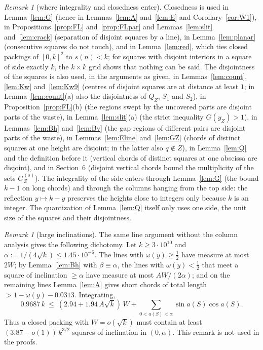 \documentclass[11pt]{amsart}
\theoremstyle{definition}
\theoremstyle{remark}
\newtheorem{remark}[theorem]{Remark}
\begin{document}
\begin{remark}[where integrality and closedness enter]
Closedness is used in Lemma~\ref{lem:G} (hence in Lemmas~\ref{lem:A} and~\ref{lem:E} and Corollary~\ref{cor:W1}), in
Propositions~\ref{prop:FL} and~\ref{prop:FLpar} and Lemmas~\ref{lem:slit} and~\ref{lem:crack} (separation of disjoint squares by a line), in
Lemma~\ref{lem:planar} (consecutive squares do not touch), and in
Lemma~\ref{lem:red}, which ties closed packings of $[0,k]^2$ to $s(n)<k$; for squares with disjoint interiors in a
square of side exactly $k$, the $k\times k$ grid shows that nothing can be said. The disjointness of the squares is also used, in the
arguments as given, in Lemmas~\ref{lem:count}, \ref{lem:Kw} and~\ref{lem:Kw9} (centres of disjoint squares are at distance at least $1$;
in Lemma~\ref{lem:count}(a) also the disjointness of $Q_Z$, $S_1$ and $S_2$), in Proposition~\ref{prop:FL}(b) (the regions swept by
the uncovered parts are disjoint parts of the waste), in Lemma~\ref{lem:slit}(a) (the strict inequality $G(y_Z)>1$), in Lemmas~\ref{lem:Bh}
and~\ref{lem:Bv} (the gap regions of different pairs are disjoint parts of the waste), in Lemmas~\ref{lem:Eline} and~\ref{lem:GZ} (chords
of distinct squares at one height are disjoint; in the latter also $q\notin Z$), in Lemma~\ref{lem:Q} and the definition before it
(vertical chords of distinct squares at one abscissa are disjoint), and in Section~6 (disjoint vertical chords bound the multiplicity of
the sets $G_Z^{(s)}$). The integrality of the side enters through
Lemma~\ref{lem:G} (the bound $k-1$ on long chords) and through the columns hanging from the top side: the reflection $y\mapsto k-y$
preserves the heights close to integers only because $k$ is an integer. The quantization of Lemma~\ref{lem:Q} itself only uses one
side, the unit size of the squares and their disjointness.
\end{remark}

\begin{remark}[large inclinations]
The same line argument without the column analysis gives the following dichotomy. Let $k\ge3\cdot10^{10}$ and
$\alpha:=1/(4\sqrt k)\le1.45\cdot10^{-6}$. The lines with $\omega(y)\ge\frac12$ have measure at most $2W$; by Lemma~\ref{lem:Bh} with $\beta\equiv\alpha$, the lines
with $\omega(y)<\frac12$ that meet a square of inclination $\ge\alpha$ have measure at most $AW/(2\alpha)$; and on the remaining lines
Lemma~\ref{lem:A} gives short chords of total length $>1-\omega(y)-0.0313$. Integrating,
\[
0.9687\,k\ \le\ (2.94+1.94\,A\sqrt k)\,W+\sum_{0<a(S)<\alpha}\sin a(S)\cos a(S).
\]
Thus a closed packing with $W=o(\sqrt k)$ must contain at least $(3.87-o(1))\,k^{3/2}$ squares of inclination in $(0,\alpha)$.
This remark is not used in the proofs.
\end{remark}
\end{document}
